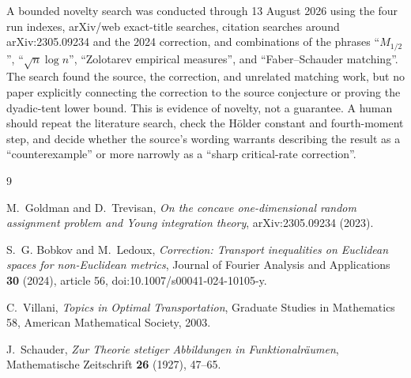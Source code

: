 \documentclass[11pt]{article}
\begin{document}
A bounded novelty search was conducted through 13 August 2026 using the four
run indexes, arXiv/web exact-title searches, citation searches around
arXiv:2305.09234 and the 2024 correction, and combinations of the phrases
``\(M_{1/2}\)'', ``\(\sqrt n\log n\)'', ``Zolotarev empirical measures'',
and ``Faber--Schauder matching''.  The search found the source, the correction,
and unrelated matching work, but no paper explicitly connecting the
correction to the source conjecture or proving the dyadic-tent lower bound.
This is evidence of novelty, not a guarantee.  A human should repeat the
literature search, check the Hölder constant and fourth-moment step, and decide
whether the source's wording warrants describing the result as a
``counterexample'' or more narrowly as a ``sharp critical-rate correction''.

\begin{thebibliography}{9}

M.~Goldman and D.~Trevisan,
\emph{On the concave one-dimensional random assignment problem and Young
integration theory}, arXiv:2305.09234 (2023).

S.~G. Bobkov and M.~Ledoux,
\emph{Correction: Transport inequalities on Euclidean spaces for
non-Euclidean metrics}, Journal of Fourier Analysis and Applications
\textbf{30} (2024), article 56,
doi:10.1007/s00041-024-10105-y.

C.~Villani,
\emph{Topics in Optimal Transportation}, Graduate Studies in Mathematics 58,
American Mathematical Society, 2003.

J.~Schauder,
\emph{Zur Theorie stetiger Abbildungen in Funktionalr\"aumen},
Mathematische Zeitschrift \textbf{26} (1927), 47--65.

\end{thebibliography}
\end{document}
